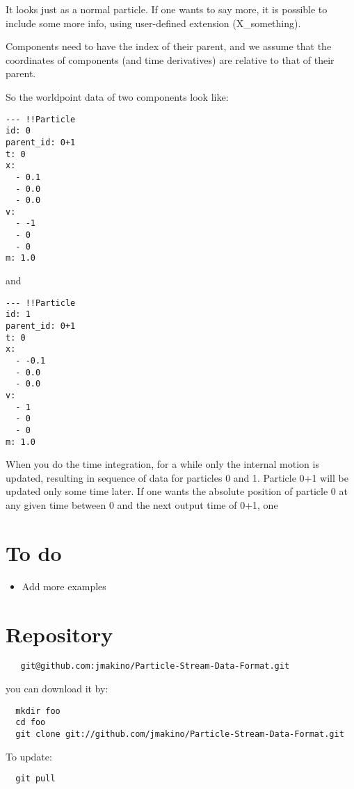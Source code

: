 \documentclass[12pt]{article}
\begin{document}
It looks just as a normal particle. If one wants to say more, it is
possible to include some more info, using user-defined extension
(X\_something).

Components need to have the index of their parent, and we assume that
the coordinates of components (and time derivatives) are relative to
that of their parent.

So the worldpoint data of two components look like:

\begin{verbatim}
--- !!Particle
id: 0
parent_id: 0+1
t: 0
x:
  - 0.1
  - 0.0
  - 0.0
v:
  - -1
  - 0
  - 0
m: 1.0
\end{verbatim}

and

\begin{verbatim}
--- !!Particle
id: 1
parent_id: 0+1
t: 0
x:
  - -0.1
  - 0.0
  - 0.0
v:
  - 1
  - 0
  - 0
m: 1.0
\end{verbatim}


When you do the time integration, for a while only the internal motion
is updated, resulting in sequence of data for particles 0 and
1. Particle 0+1 will be updated only some time later. 
If one wants the absolute position of particle 0 at any
given time between 0 and the next output time of 0+1, one 
\section{To do}

\begin{itemize}
\item Add more examples
\end{itemize}  


\appendix

\section{Repository}


\begin{verbatim}
   git@github.com:jmakino/Particle-Stream-Data-Format.git
\end{verbatim}

you can download it by:
\begin{verbatim}
  mkdir foo
  cd foo
  git clone git://github.com/jmakino/Particle-Stream-Data-Format.git
\end{verbatim}

To update:

\begin{verbatim}
  git pull
\end{verbatim}
  
\end{document}
